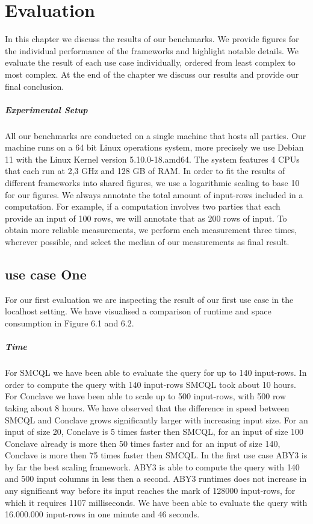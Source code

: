 \chapter{Evaluation}
\label{Evaluation}	
In this chapter we discuss the results of our benchmarks. We provide figures for the individual performance of the frameworks and highlight notable details. We evaluate the result of each use case individually, ordered from least complex to most complex. At the end of the chapter we discuss our results and provide our final conclusion.
\paragraph{Experimental Setup}
All our benchmarks are conducted on a single machine that hosts all parties. Our machine runs on a 64 bit Linux operations system, more precisely we use Debian 11 with the Linux Kernel version 5.10.0-18.amd64. The system features 4 CPUs that each run at 2,3 GHz and 128 GB of RAM. In order to fit the results of different frameworks into shared figures, we use a logarithmic scaling to base 10 for our figures. We always annotate the total amount of input-rows included in a computation. For example, if a computation involves two parties that each provide an input of 100 rows, we will annotate that as 200 rows of input. To obtain more reliable measurements, we perform each measurement three times, wherever possible, and select the median of our measurements as final result.
\section{use case One}
For our first evaluation we are inspecting the result of our first use case in the localhost setting. We have visualised a comparison of runtime and space consumption in Figure 6.1 and 6.2.

\paragraph{Time}
For SMCQL we have been able to evaluate the query for up to 140 input-rows. In order to compute the query with 140 input-rows SMCQL took about 10 hours. For Conclave we have been able to scale up to 500 input-rows, with 500 row taking about 8 hours.
We have observed that the difference in speed between SMCQL and Conclave grows significantly larger with increasing input size. For an input of size 20, Conclave is 5 times faster then SMCQL, for an input of size 100 Conclave already is more then 50 times faster and for an input of size 140, Conclave is more then 75 times faster then SMCQL. In the first use case ABY3 is by far the best scaling framework. ABY3 is able to compute the query with 140 and 500 input columns in less then a second. ABY3 runtimes does not increase in any significant way before its input reaches the mark of 128000 input-rows, for which it requires 1107 milliseconds. We have been able to evaluate the query with 16.000.000 input-rows in one minute and 46 seconds. 
